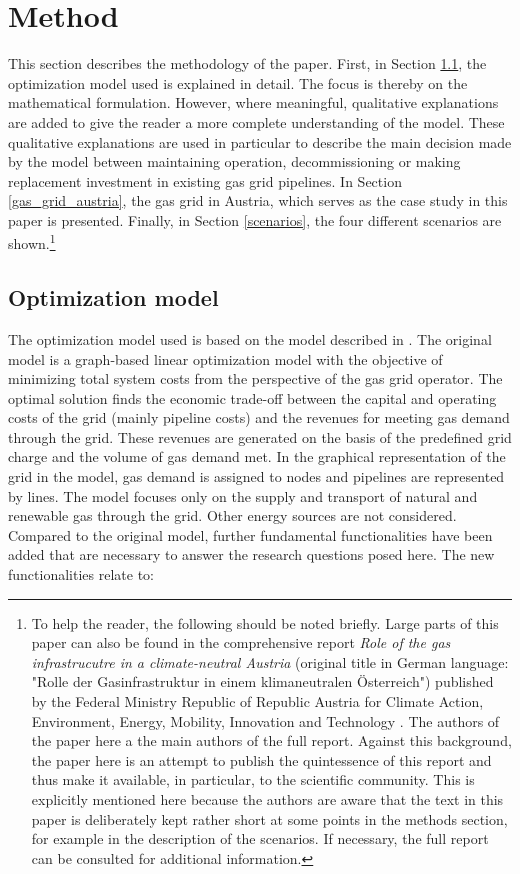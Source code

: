  \section{Method}\label{methodology}
This section describes the methodology of the paper. First, in Section \ref{model}, the optimization model used is explained in detail. The focus is thereby on the mathematical formulation. However, where meaningful, qualitative explanations are added to give the reader a more complete understanding of the model. These qualitative explanations are used in particular to describe the main decision made by the model between maintaining operation, decommissioning or making replacement investment in existing gas grid pipelines. In Section \ref{gas_grid_austria}, the gas grid in Austria, which serves as the case study in this paper is presented. Finally, in Section \ref{scenarios}, the four different scenarios are shown.\footnote{To help the reader, the following should be noted briefly. Large parts of this paper can also be found in the comprehensive report \textit{Role of the gas infrastrucutre in a climate-neutral Austria} (original title in German language: "Rolle der Gasinfrastruktur in einem klimaneutralen Österreich") published by the Federal Ministry Republic of Republic Austria for Climate Action, Environment, Energy, Mobility, Innovation and Technology \cite{frontier2023}. The authors of the paper here a the main authors of the full report. Against this background, the paper here is an attempt to publish the quintessence of this report and thus make it available, in particular, to the scientific community. This is explicitly mentioned here because the authors are aware that the text in this paper is deliberately kept rather short at some points in the methods section, for example in the description of the scenarios. If necessary, the full report can be consulted for additional information.}

 \subsection{Optimization model}\label{model}
 
The optimization model used is based on the model described in \cite{zwickl2023design}. The original model is a graph-based linear optimization model with the objective of minimizing total system costs from the perspective of the gas grid operator. The optimal solution finds the economic trade-off between the capital and operating costs of the grid (mainly pipeline costs) and the revenues for meeting gas demand through the grid. These revenues are generated on the basis of the predefined grid charge and the volume of gas demand met. In the graphical representation of the grid in the model, gas demand is assigned to nodes and pipelines are represented by lines. The model focuses only on the supply and transport of natural and renewable gas through the grid. Other energy sources are not considered. Compared to the original model, further fundamental functionalities have been added that are necessary to answer the research questions posed here. The new functionalities relate to:

